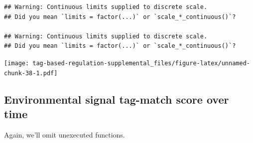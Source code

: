 \documentclass[
]{book}
\begin{document}
\begin{verbatim}
## Warning: Continuous limits supplied to discrete scale.
## Did you mean `limits = factor(...)` or `scale_*_continuous()`?

## Warning: Continuous limits supplied to discrete scale.
## Did you mean `limits = factor(...)` or `scale_*_continuous()`?
\end{verbatim}

\texttt{[image: tag-based-regulation-supplemental\_files/figure-latex/unnamed-chunk-38-1.pdf]}

\hypertarget{environmental-signal-tag-match-score-over-time}{%
\subsection{Environmental signal tag-match score over time}\label{environmental-signal-tag-match-score-over-time}}

Again, we'll omit unexecuted functions.
\end{document}

